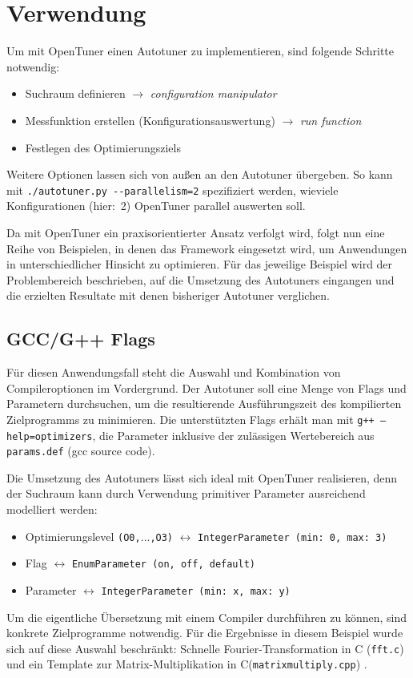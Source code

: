 \documentclass[a4paper,11pt]{scrartcl}
\def\CC{{C\nolinebreak[4]\hspace{-.05em}\raisebox{.4ex}{\tiny\bf ++}}}
\begin{document}
\section{Verwendung}
Um mit OpenTuner einen Autotuner zu implementieren, sind folgende Schritte notwendig:
\begin{itemize}
  \item Suchraum definieren $\rightarrow$ \emph{configuration manipulator}
  \item Messfunktion erstellen (Konfigurationsauswertung) $\rightarrow$ \emph{run function}
  \item Festlegen des Optimierungsziels
\end{itemize}
Weitere Optionen lassen sich von außen an den Autotuner übergeben. So kann 
mit \texttt{./autotuner.py -{}-parallelism=2} spezifiziert werden, wieviele Konfigurationen
(hier:~2) OpenTuner parallel auswerten soll. \newline

Da mit OpenTuner ein praxisorientierter Ansatz verfolgt wird, folgt nun eine Reihe von
Beispielen, in denen das Framework eingesetzt wird, um Anwendungen in unterschiedlicher 
Hinsicht zu optimieren. Für das jeweilige Beispiel wird der Problembereich beschrieben,
auf die Umsetzung des Autotuners eingangen und die erzielten Resultate mit denen bisheriger
Autotuner verglichen.

\subsection{GCC/G++ Flags}
Für diesen Anwendungsfall steht die Auswahl und Kombination von Compileroptionen
im Vordergrund. Der Autotuner soll eine Menge von Flags und Parametern durchsuchen,
um die resultierende Ausführungszeit des kompilierten Zielprogramms zu minimieren.
Die unterstützten Flags erhält man mit \texttt{g++ --help=optimizers}, die 
Parameter inklusive der zulässigen Wertebereich aus \texttt{params.def} (gcc source code). \newline

Die Umsetzung des Autotuners lässt sich ideal mit OpenTuner realisieren, denn der
Suchraum kann durch Verwendung primitiver Parameter ausreichend modelliert werden:
\begin{itemize}
  \item Optimierungslevel \texttt{(O0,$\ldots$,O3)} $\leftrightarrow$ \texttt{IntegerParameter~(min:~0, max:~3)}
  \item Flag $\leftrightarrow$ \texttt{EnumParameter~(on,~off,~default)}
  \item Parameter $\leftrightarrow$ \texttt{IntegerParameter~(min:~x, max:~y)}
\end{itemize}
Um die eigentliche Übersetzung mit einem Compiler durchführen zu können, sind konkrete
Zielprogramme notwendig. Für die Ergebnisse in diesem Beispiel wurde sich auf diese
Auswahl beschränkt: Schnelle Fourier-Transformation in C (\texttt{fft.c}) \cite{fftc} und 
ein Template zur Matrix-Multiplikation in \CC (\texttt{matrixmultiply.cpp}) \cite{mmcpp}. \newline
\end{document}

